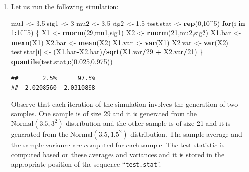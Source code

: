 \documentclass[]{krantz}
\makeatletter
\newenvironment{Shaded}{\begin{snugshade}}{\end{snugshade}}
\newcommand{\ControlFlowTok}[1]{\textcolor[rgb]{0.13,0.29,0.53}{\textbf{#1}}}
\newcommand{\DecValTok}[1]{\textcolor[rgb]{0.00,0.00,0.81}{#1}}
\newcommand{\FloatTok}[1]{\textcolor[rgb]{0.00,0.00,0.81}{#1}}
\newcommand{\KeywordTok}[1]{\textcolor[rgb]{0.13,0.29,0.53}{\textbf{#1}}}
\newcommand{\NormalTok}[1]{#1}
\newcommand{\OperatorTok}[1]{\textcolor[rgb]{0.81,0.36,0.00}{\textbf{#1}}}
\newcommand{\StringTok}[1]{\textcolor[rgb]{0.31,0.60,0.02}{#1}}
\newenvironment{kframe}{%
\medskip{}
\setlength{\fboxsep}{.8em}
 \def\at@end@of@kframe{}%
 \ifinner\ifhmode%
  \def\at@end@of@kframe{\end{minipage}}%
  \begin{minipage}{\columnwidth}%
 \fi\fi%
 \def\FrameCommand##1{\hskip\@totalleftmargin \hskip-\fboxsep
 \colorbox{shadecolor}{##1}\hskip-\fboxsep
     \hskip-\linewidth \hskip-\@totalleftmargin \hskip\columnwidth}%
 \MakeFramed {\advance\hsize-\width
   \@totalleftmargin\z@ \linewidth\hsize
   \@setminipage}}%
 {\par\unskip\endMakeFramed%
 \at@end@of@kframe}
\renewenvironment{Shaded}{\begin{kframe}}{\end{kframe}}
\theoremstyle{definition}
\theoremstyle{definition}
\theoremstyle{definition}
\theoremstyle{remark}
\makeatother
\begin{document}
\begin{enumerate}
\def\labelenumi{\arabic{enumi}.}
\item
  Let us run the following
  simulation:

\begin{Shaded}
\begin{Highlighting}[]
\NormalTok{mu1 <-}\StringTok{ }\FloatTok{3.5}
\NormalTok{sig1 <-}\StringTok{ }\DecValTok{3}
\NormalTok{mu2 <-}\StringTok{ }\FloatTok{3.5}
\NormalTok{sig2 <-}\StringTok{ }\FloatTok{1.5}
\NormalTok{test.stat <-}\StringTok{ }\KeywordTok{rep}\NormalTok{(}\DecValTok{0}\NormalTok{,}\DecValTok{10}\OperatorTok{^}\DecValTok{5}\NormalTok{)}
\ControlFlowTok{for}\NormalTok{(i }\ControlFlowTok{in} \DecValTok{1}\OperatorTok{:}\DecValTok{10}\OperatorTok{^}\DecValTok{5}\NormalTok{) \{}
\NormalTok{  X1 <-}\StringTok{ }\KeywordTok{rnorm}\NormalTok{(}\DecValTok{29}\NormalTok{,mu1,sig1)}
\NormalTok{  X2 <-}\StringTok{ }\KeywordTok{rnorm}\NormalTok{(}\DecValTok{21}\NormalTok{,mu2,sig2)}
\NormalTok{  X1.bar <-}\StringTok{ }\KeywordTok{mean}\NormalTok{(X1)}
\NormalTok{  X2.bar <-}\StringTok{ }\KeywordTok{mean}\NormalTok{(X2)}
\NormalTok{  X1.var <-}\StringTok{ }\KeywordTok{var}\NormalTok{(X1)}
\NormalTok{  X2.var <-}\StringTok{ }\KeywordTok{var}\NormalTok{(X2)}
\NormalTok{  test.stat[i] <-}\StringTok{ }\NormalTok{(X1.bar}\OperatorTok{-}\NormalTok{X2.bar)}\OperatorTok{/}\KeywordTok{sqrt}\NormalTok{(X1.var}\OperatorTok{/}\DecValTok{29} \OperatorTok{+}\StringTok{ }\NormalTok{X2.var}\OperatorTok{/}\DecValTok{21}\NormalTok{)}
\NormalTok{\}}
\KeywordTok{quantile}\NormalTok{(test.stat,}\KeywordTok{c}\NormalTok{(}\FloatTok{0.025}\NormalTok{,}\FloatTok{0.975}\NormalTok{))}
\end{Highlighting}
\end{Shaded}

\begin{verbatim}
##       2.5%      97.5% 
## -2.0208560  2.0310898
\end{verbatim}

  Observe that each iteration of the simulation involves the generation of
  two samples. One sample is of size 29 and it is generated from the
  \(\mathrm{Normal}(3.5,3^2)\) distribution and the other sample is of size
  21 and it is generated from the \(\mathrm{Normal}(3.5,1.5^2)\)
  distribution. The sample average and the sample variance are computed
  for each sample. The test statistic is computed based on these averages
  and variances and it is stored in the appropriate position of the
  sequence ``\texttt{test.stat}''.


\end{enumerate}
\end{document}
